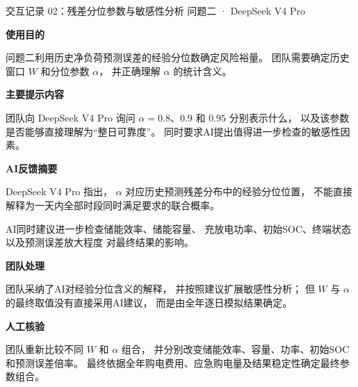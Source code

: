 \documentclass[UTF8,a4paper,11pt]{ctexart}
\newcommand{\recorditem}[1]{%
    \par\vspace{0.28em}
    \noindent\textbf{#1}\quad
}
\begin{document}
\begin{recordbox}
{交互记录 02：残差分位参数与敏感性分析}
{问题二 · DeepSeek V4 Pro}

\recorditem{使用目的}
问题二利用历史净负荷预测误差的经验分位数确定风险裕量。
团队需要确定历史窗口 $W$ 和分位参数 $\alpha$，
并正确理解 $\alpha$ 的统计含义。

\recorditem{主要提示内容}
团队向 DeepSeek V4 Pro 询问
$\alpha=0.8$、$0.9$ 和 $0.95$
分别表示什么，
以及该参数是否能够直接理解为“整日可靠度”。
同时要求AI提出值得进一步检查的敏感性因素。

\recorditem{AI反馈摘要}
DeepSeek V4 Pro 指出，
$\alpha$ 对应历史预测残差分布中的经验分位位置，
不能直接解释为一天内全部时段同时满足要求的联合概率。

AI同时建议进一步检查储能效率、储能容量、
充放电功率、初始SOC、终端状态以及预测误差放大程度
对最终结果的影响。

\recorditem{团队处理}
团队采纳了AI对经验分位含义的解释，
并按照建议扩展敏感性分析；
但 $W$ 与 $\alpha$ 的最终取值没有直接采用AI建议，
而是由全年逐日模拟结果确定。

\recorditem{人工核验}
团队重新比较不同 $W$ 和 $\alpha$ 组合，
并分别改变储能效率、容量、功率、初始SOC和预测误差倍率。
最终依据全年购电费用、应急购电量及结果稳定性确定最终参数组合。

\end{recordbox}
\end{document}
